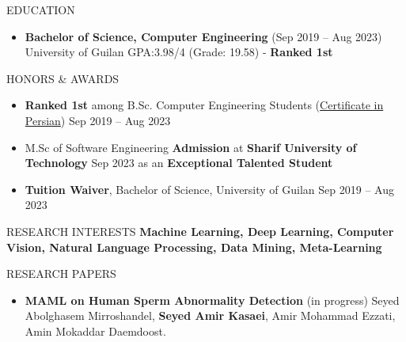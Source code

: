 \documentclass[]{CV}
\begin{document}
\resumeheader
{}
{}
{}
{}


\vspace{-4mm}
\begin{flushright}
\end{flushright}

\vspace{-7mm}
\begin{section}{EDUCATION}
\begin{itemize}
\item \textbf{Bachelor of Science, Computer Engineering} \hfill (Sep 2019 -- Aug 2023)\newline
{University of Guilan \newline GPA:3.98/4 (Grade: 19.58) - \textbf{Ranked 1st}}
\end{itemize}
\end{section}

\vspace{-2mm}
\begin{section}{HONORS \& AWARDS}
\begin{itemize}
\item \textbf{Ranked 1st} among B.Sc. Computer Engineering Students (\href{https://drive.google.com/file/d/1RfuN4xRnWvJ53gFADrlBrSxIEHqgPVWS/view?usp=sharing}{Certificate in Persian}) \hfill Sep 2019 -- Aug 2023 

\item M.Sc of Software Engineering \textbf{Admission} at \textbf{Sharif University of Technology} \hfill Sep 2023
\newline as an \textbf{Exceptional Talented Student} 

\item \textbf{Tuition Waiver}, Bachelor of Science, University of Guilan \hfill Sep 2019 -- Aug 2023 
\end{itemize}
\end{section}
\begin{section}{RESEARCH INTERESTS}
    \textbf{Machine Learning, Deep Learning, Computer Vision, Natural Language Processing, Data Mining, Meta-Learning}
\end{section}
\vspace{-2mm}
\begin{section}{RESEARCH PAPERS}
\begin{itemize}
\item \textbf{MAML on Human Sperm Abnormality Detection} \hfill (in progress)\newline
Seyed Abolghasem Mirroshandel, \textbf{Seyed Amir Kasaei}, Amir Mohammad  Ezzati, Amin Mokaddar Daemdoost.
\end{itemize}
\end{section}
\vspace{-2mm}
\end{document}
